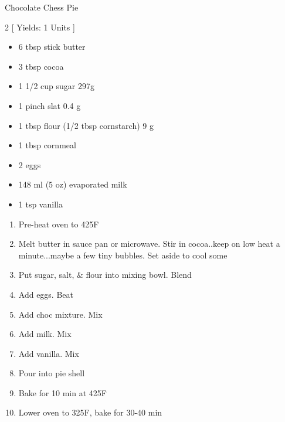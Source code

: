 \begin{Large}
    Chocolate Chess Pie
\end{Large}

\begin{scriptsize}
\begin{multicols}{2}
[
\vspace{1em}
Yields: 1 Units
\vspace{-1.5em}
]

\begin{itemize}
    \item 6 tbsp stick butter
    \item 3 tbsp cocoa
    \item 1 1/2 cup sugar 297g
    \item 1 pinch slat 0.4 g
    \item 1 tbsp flour (1/2 tbsp cornstarch) 9 g
    \item 1 tbsp cornmeal
    \item 2 eggs
    \item 148 ml (5 oz) evaporated milk
    \item 1 tsp vanilla
\end{itemize}
\end{multicols}
\end{scriptsize}

\begin{footnotesize}
\begin{enumerate}
    \item Pre-heat oven to 425\degree F
    \item Melt butter in sauce pan or microwave. Stir in cocoa..keep on low heat a minute...maybe a few tiny bubbles. Set aside to cool some

    \item Put sugar, salt, & flour into mixing bowl. Blend
    \item Add eggs. Beat
    \item Add choc mixture. Mix
    \item Add milk. Mix
    \item Add vanilla. Mix
    \item Pour into pie shell
    \item Bake for 10 min at 425\degree F
    \item Lower oven to 325\degree F, bake for 30-40 min

\end{enumerate}
\end{footnotesize}

\vspace{2em}
